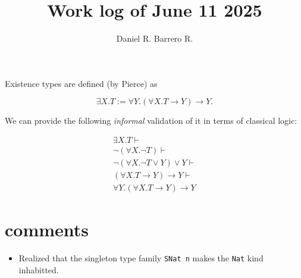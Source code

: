 \documentclass{amsart}
\title{Work log of June 11 2025}
\author{Daniel R. Barrero R.}
\begin{document}
\maketitle

Existence types are defined (by Pierce) as  

$$
\exists X . T := \forall Y . (\forall X . T \to Y) \to Y.
$$

We can provide the following \emph{informal} validation of it in
terms of classical logic:

\begin{eqnarray*}
	\exists X . T \vdash \\
	\neg (\forall X . \neg T) \vdash \\
	\neg (\forall X . \neg T \lor Y) \lor Y \vdash \\
	(\forall X . T \to Y) \to Y \vdash \\
	\forall Y . (\forall X . T \to Y) \to Y
\end{eqnarray*}

\section{comments}

\begin{itemize}
	\item Realized that the singleton type family \texttt{SNat n} makes the
		\texttt{Nat} kind inhabitted.
\end{itemize}
\end{document}
